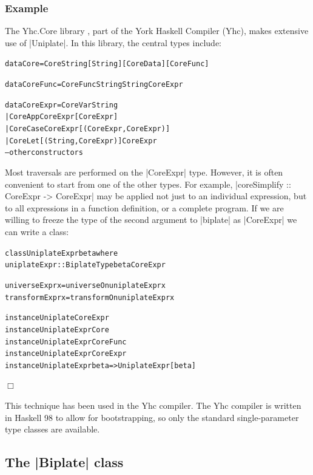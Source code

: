 \documentclass[preprint]{sigplanconf}
\newcounter{exmp}
\newcommand{\yesexample}{\refstepcounter{exmp}\subsubsection*{Example \arabic{exmp}}}
\newcommand{\noexample}{\hfill$\Box$}
\newenvironment{code}{\begin{alltt}\small}{\end{alltt}}
\newenvironment{example}{\yesexample}{\noexample}
\newcommand{\codeexample}{\vspace{-9mm}\par}
\begin{document}
\begin{example}
The Yhc.Core library \citep{me:yhc_core}, part of the York Haskell Compiler (Yhc), makes extensive use of |Uniplate|. In this library, the central types include:

\begin{code}
data Core      =  Core String [String] [CoreData] [CoreFunc]

data CoreFunc  =  CoreFunc String String CoreExpr

data CoreExpr  =  CoreVar   String
               |  CoreApp   CoreExpr  [CoreExpr]
               |  CoreCase  CoreExpr  [(CoreExpr, CoreExpr)]
               |  CoreLet   [(String, CoreExpr)] CoreExpr
                  -- other constructors
\end{code}

Most traversals are performed on the |CoreExpr| type. However, it is often convenient to start from one of the other types. For example, |coreSimplify :: CoreExpr -> CoreExpr| may be applied not just to an individual expression, but to all expressions in a function definition, or a complete program. If we are willing to freeze the type of the second argument to |biplate| as |CoreExpr| we can write a class:

\begin{code}
class  UniplateExpr beta where
       uniplateExpr :: BiplateType beta CoreExpr

universeExpr   x = universeOn   uniplateExpr x
transformExpr  x = transformOn  uniplateExpr x

instance Uniplate CoreExpr
instance UniplateExpr Core
instance UniplateExpr CoreFunc
instance UniplateExpr CoreExpr
instance UniplateExpr beta => UniplateExpr [beta]
\end{code}\codeexample
\end{example}
\bigskip

This technique has been used in the Yhc compiler. The Yhc compiler is written in Haskell 98 to allow for bootstrapping, so only the standard single-parameter type classes are available.

\subsection{The |Biplate| class}
\end{document}
